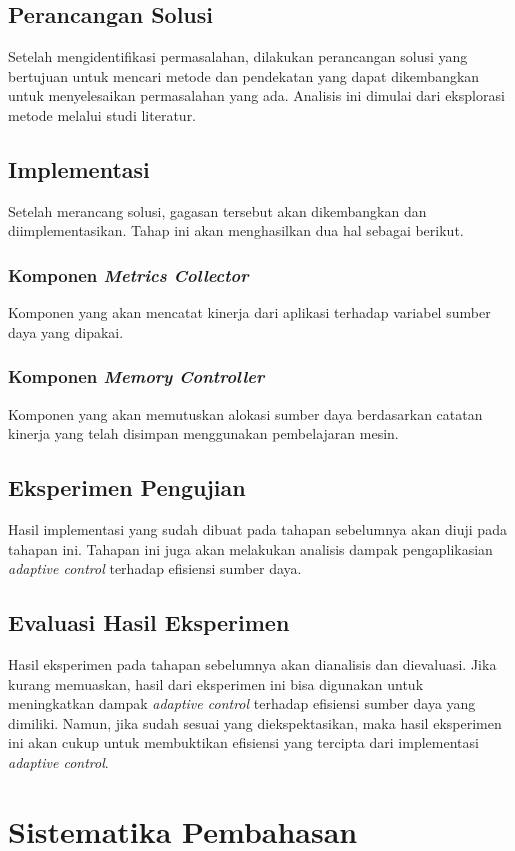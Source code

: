 \subsection{Perancangan Solusi}
Setelah mengidentifikasi permasalahan, dilakukan perancangan solusi yang bertujuan untuk mencari metode dan pendekatan yang dapat dikembangkan untuk menyelesaikan permasalahan yang ada. Analisis ini dimulai dari eksplorasi metode melalui studi literatur.
\subsection{Implementasi}
Setelah merancang solusi, gagasan tersebut akan dikembangkan dan diimplementasikan. Tahap ini akan menghasilkan dua hal sebagai berikut.
\subsubsection{Komponen \textit{Metrics Collector}}
Komponen yang akan mencatat kinerja dari aplikasi terhadap variabel sumber daya yang dipakai.
\subsubsection{Komponen \textit{Memory Controller}}
Komponen yang akan memutuskan alokasi sumber daya berdasarkan catatan kinerja yang telah disimpan menggunakan pembelajaran mesin.
\subsection{Eksperimen Pengujian}
Hasil implementasi yang sudah dibuat pada tahapan sebelumnya akan diuji pada tahapan ini. Tahapan ini juga akan melakukan analisis dampak pengaplikasian \textit{adaptive control} terhadap efisiensi sumber daya.
\subsection{Evaluasi Hasil Eksperimen}
Hasil eksperimen pada tahapan sebelumnya akan dianalisis dan dievaluasi. Jika kurang memuaskan, hasil dari eksperimen ini bisa digunakan untuk meningkatkan dampak \textit{adaptive control} terhadap efisiensi sumber daya yang dimiliki. Namun, jika sudah sesuai yang diekspektasikan, maka hasil eksperimen ini akan cukup untuk membuktikan efisiensi yang tercipta dari implementasi \textit{adaptive control}.

\section{Sistematika Pembahasan}


